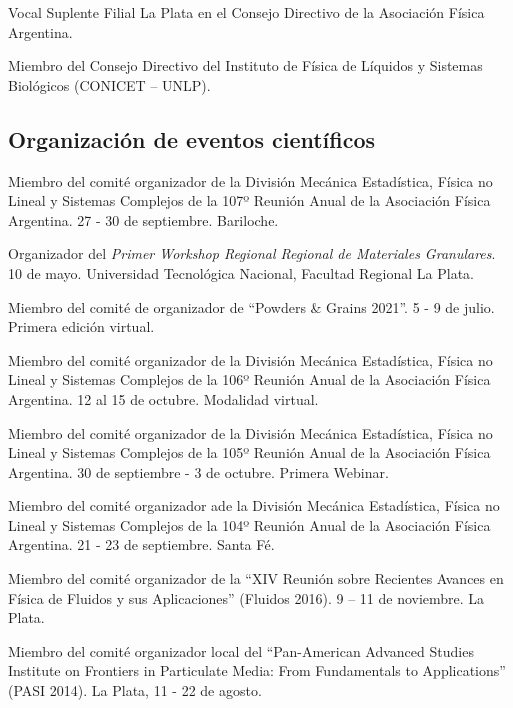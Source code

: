    Vocal Suplente Filial La Plata en el Consejo Directivo de la Asociación Física Argentina.
  
   Miembro del Consejo Directivo del Instituto de Física de Líquidos y Sistemas Biológicos (CONICET -- UNLP).
  


\subsection{Organización de eventos científicos}

 Miembro del comité organizador de la División Mecánica Estadística, Física no Lineal y Sistemas Complejos de la 107º Reunión Anual de la Asociación Física Argentina. 27 - 30 de septiembre. Bariloche.


 Organizador del \textit{Primer Workshop Regional Regional de Materiales Granulares}. 10 de mayo. Universidad Tecnológica Nacional, Facultad Regional La Plata.

 Miembro del comité de organizador de ``Powders \& Grains 2021''. 5 - 9 de julio. Primera edición virtual.

 Miembro del comité organizador de la División Mecánica Estadística, Física no Lineal y Sistemas Complejos de la 106º Reunión Anual de la Asociación Física Argentina. 12 al 15 de octubre. Modalidad virtual.

 Miembro del comité organizador de la División Mecánica Estadística, Física no Lineal y Sistemas Complejos de la 105º Reunión Anual de la Asociación Física Argentina. 30 de septiembre - 3 de octubre. Primera Webinar.

 Miembro del comité organizador ade la División Mecánica Estadística, Física no Lineal y Sistemas Complejos de la 104º Reunión Anual de la Asociación Física Argentina. 21 - 23 de septiembre. Santa Fé.

 Miembro del comité organizador de la ``XIV Reunión sobre Recientes Avances en Física de Fluidos y sus Aplicaciones'' (Fluidos 2016). 9 -- 11 de noviembre. La Plata.

 Miembro del comité organizador local del ``Pan-American Advanced Studies Institute on Frontiers in Particulate Media: From Fundamentals to Applications'' (PASI 2014). La Plata, 11 - 22 de agosto.
